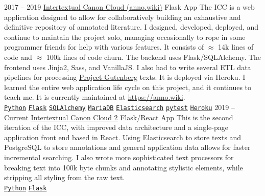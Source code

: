 \documentclass[9pt]{developercv} %
\begin{document}

\begin{entrylist}
    \entry
        {2017 -- 2019}
        {{\href{https://github.com/Anno-Wiki/icc}{Intertextual Canon Cloud (anno.wiki)}}}
        {Flask App}
        {
            The ICC is a web application designed to allow for collaboratively
            building an exhaustive and definitive repository of annotated
            literature. I designed, developed, deployed, and continue to
            maintain the project solo, managing occasionally to rope in some
            programmer friends for help with various features. It consists of
            $\approx$ 14k lines of code and $\approx$ 100k lines of code churn.
            The backend uses Flask/SQLAlchemy. The frontend uses Jinja2, Sass,
            and VanillaJS. I also had to write several ETL data pipelines for
            processing {\href{https://gutenberg.org}{Project Gutenberg}} texts.
            It is deployed via Heroku. I learned the entire web application life
            cycle on this project, and it continues to teach me. It is currently
            maintained at {\href{https://anno.wiki}{https://anno.wiki}}.
        \\
        \texttt{{\href{https://www.python.org/}{Python}}}\slashsep
        \texttt{{\href{https://flask.palletsprojects.com/en/1.1.x/}{Flask}}}\slashsep
        \texttt{{\href{https://www.sqlalchemy.org/}{SQLAlchemy}}}\slashsep
        \texttt{{\href{https://mariadb.org/}{MariaDB}}}\slashsep
        \texttt{{\href{https://www.elastic.co/}{Elasticsearch}}}\slashsep
        \texttt{{\href{https://docs.pytest.org/en/stable/}{pytest}}}\slashsep
        \texttt{{\href{https://www.heroku.com/}{Heroku}}}
        }
    \entry
        {2019 -- Current}
        {{\href{https://github.com/Anno-Wiki}{Intertextual Canon Cloud 2}}}
        {Flask/React App}
        {
            This is the second iteration of the ICC, with improved data
            architecture and a single-page application front end based in React.
            Using Elasticsearch to store texts and PostgreSQL to store
            annotations and general application data allows for faster
            incremental searching. I also wrote more sophisticated text
            processors for breaking text into 100k byte chunks and annotating
            stylistic elements, while stripping all styling from the raw text.
        \\
        \texttt{{\href{https://www.python.org/}{Python}}}\slashsep
        \texttt{{\href{https://flask.palletsprojects.com/en/1.1.x/}{Flask}}}\slashsep
}
\end{entrylist}
\end{document}
